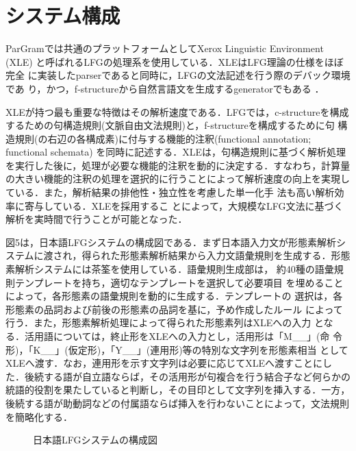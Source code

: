 \section{システム構成}
ParGramでは共通のプラットフォームとしてXerox Linguistic Environment
(XLE) と呼ばれるLFGの処理系を使用している．XLEはLFG理論の仕様をほぼ完全
に実装したparserであると同時に，LFGの文法記述を行う際のデバック環境であ
り，かつ，f-structureから自然言語文を生成するgeneratorでもある
\cite{KandW2000}．

XLEが持つ最も重要な特徴はその解析速度である．LFGでは，c-structureを構成
するための句構造規則(文脈自由文法規則)と，f-structureを構成するために句
構造規則(の右辺の各構成素)に付与する機能的注釈(functional annotation;
functional schemata) を同時に記述する．XLEは，句構造規則に基づく解析処理
を実行した後に，処理が必要な機能的注釈を動的に決定する．すなわち，計算量
の大きい機能的注釈の処理を選択的に行うことによって解析速度の向上を実現し
ている\cite{MandK1993}．また，解析結果の排他性・独立性を考慮した単一化手
法\cite{MandK1991}も高い解析効率に寄与している．XLEを採用するこ
とによって，大規模なLFG文法に基づく解析を実時間で行うことが可能となった．

図5は，日本語LFGシステムの構成図である．まず日本語入力文が形態素解析シ
ステムに渡され，得られた形態素解析結果から入力文語彙規則を生成する．形態
素解析システムには茶筌\cite{chasen}を使用している．語彙規則生成部は，
約40種の語彙規則テンプレートを持ち，適切なテンプレートを選択して必要項目
を埋めることによって，各形態素の語彙規則を動的に生成する．テンプレートの
選択は，各形態素の品詞および前後の形態素の品詞を基に，予め作成したルール
によって行う．また，形態素解析処理によって得られた形態素列はXLEへの入力
となる．活用語については，終止形をXLEへの入力とし，活用形は「M\_\_」(命
令形)，「K\_\_」(仮定形)，「Y\_\_」(連用形)等の特別な文字列を形態素相当
としてXLEへ渡す．なお，連用形を示す文字列は必要に応じてXLEへ渡すことにし
た．後続する語が自立語ならば，その活用形が句複合を行う結合子など何らかの
統語的役割を果たしていると判断し，その目印として文字列を挿入する．一方，
後続する語が助動詞などの付属語ならば挿入を行わないことによって，文法規則
を簡略化する．

\begin{figure}[htbp]
\center
\epsfxsize=99.48mm
\caption{日本語LFGシステムの構成図}
\label{keiyoushi3_1b}
\end{figure}


